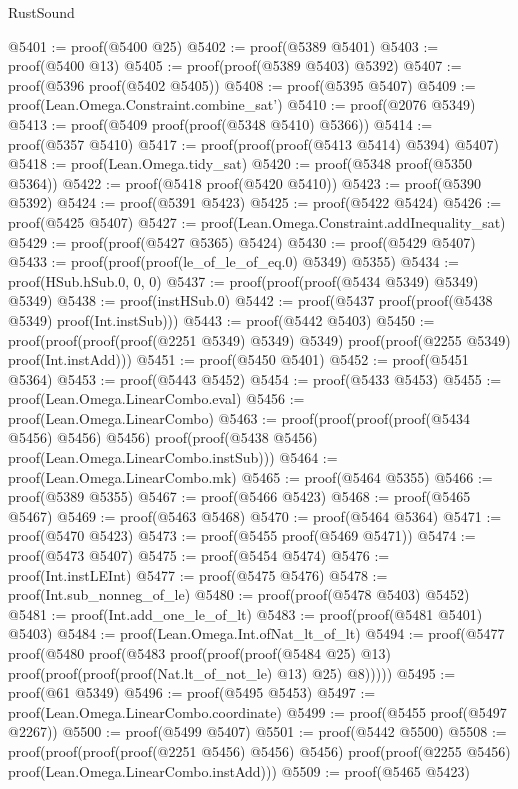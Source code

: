 \begin{lexlean}{RustSound}
\begin{coremodule}
@5401 := proof(@5400 @25)
@5402 := proof(@5389 @5401)
@5403 := proof(@5400 @13)
@5405 := proof(proof(@5389 @5403) @5392)
@5407 := proof(@5396 proof(@5402 @5405))
@5408 := proof(@5395 @5407)
@5409 := proof(Lean.Omega.Constraint.combine_sat')
@5410 := proof(@2076 @5349)
@5413 := proof(@5409 proof(proof(@5348 @5410) @5366))
@5414 := proof(@5357 @5410)
@5417 := proof(proof(proof(@5413 @5414) @5394) @5407)
@5418 := proof(Lean.Omega.tidy_sat)
@5420 := proof(@5348 proof(@5350 @5364))
@5422 := proof(@5418 proof(@5420 @5410))
@5423 := proof(@5390 @5392)
@5424 := proof(@5391 @5423)
@5425 := proof(@5422 @5424)
@5426 := proof(@5425 @5407)
@5427 := proof(Lean.Omega.Constraint.addInequality_sat)
@5429 := proof(proof(@5427 @5365) @5424)
@5430 := proof(@5429 @5407)
@5433 := proof(proof(proof(le_of_le_of_eq.{0}) @5349) @5355)
@5434 := proof(HSub.hSub.{0, 0, 0})
@5437 := proof(proof(proof(@5434 @5349) @5349) @5349)
@5438 := proof(instHSub.{0})
@5442 := proof(@5437 proof(proof(@5438 @5349) proof(Int.instSub)))
@5443 := proof(@5442 @5403)
@5450 := proof(proof(proof(proof(@2251 @5349) @5349) @5349)
      proof(proof(@2255 @5349) proof(Int.instAdd)))
@5451 := proof(@5450 @5401)
@5452 := proof(@5451 @5364)
@5453 := proof(@5443 @5452)
@5454 := proof(@5433 @5453)
@5455 := proof(Lean.Omega.LinearCombo.eval)
@5456 := proof(Lean.Omega.LinearCombo)
@5463 := proof(proof(proof(proof(@5434 @5456) @5456) @5456)
      proof(proof(@5438 @5456) proof(Lean.Omega.LinearCombo.instSub)))
@5464 := proof(Lean.Omega.LinearCombo.mk)
@5465 := proof(@5464 @5355)
@5466 := proof(@5389 @5355)
@5467 := proof(@5466 @5423)
@5468 := proof(@5465 @5467)
@5469 := proof(@5463 @5468)
@5470 := proof(@5464 @5364)
@5471 := proof(@5470 @5423)
@5473 := proof(@5455 proof(@5469 @5471))
@5474 := proof(@5473 @5407)
@5475 := proof(@5454 @5474)
@5476 := proof(Int.instLEInt)
@5477 := proof(@5475 @5476)
@5478 := proof(Int.sub_nonneg_of_le)
@5480 := proof(proof(@5478 @5403) @5452)
@5481 := proof(Int.add_one_le_of_lt)
@5483 := proof(proof(@5481 @5401) @5403)
@5484 := proof(Lean.Omega.Int.ofNat_lt_of_lt)
@5494 := proof(@5477
      proof(@5480
          proof(@5483
              proof(proof(proof(@5484 @25) @13)
                  proof(proof(proof(proof(Nat.lt_of_not_le) @13) @25) @8)))))
@5495 := proof(@61 @5349)
@5496 := proof(@5495 @5453)
@5497 := proof(Lean.Omega.LinearCombo.coordinate)
@5499 := proof(@5455 proof(@5497 @2267))
@5500 := proof(@5499 @5407)
@5501 := proof(@5442 @5500)
@5508 := proof(proof(proof(proof(@2251 @5456) @5456) @5456)
      proof(proof(@2255 @5456) proof(Lean.Omega.LinearCombo.instAdd)))
@5509 := proof(@5465 @5423)

\end{coremodule}
\end{lexlean}
